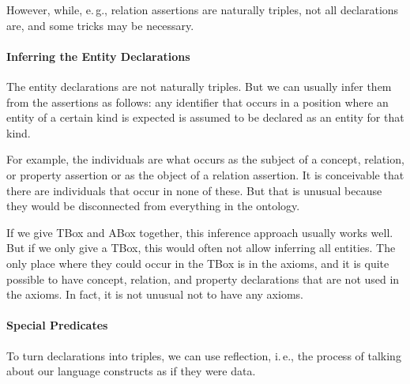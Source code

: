 However, while, e.\,g., relation assertions are naturally triples, not all declarations are, and some tricks may be necessary.

\paragraph{Inferring the Entity Declarations}
The entity declarations are not naturally triples.
But we can usually infer them from the assertions as follows: any identifier that occurs in a position where an entity of a certain kind is expected is assumed to be declared as an entity for that kind.

For example, the individuals are what occurs as the subject of a concept, relation, or property assertion or as the object of a relation assertion.
It is conceivable that there are individuals that occur in none of these.
But that is unusual because they would be disconnected from everything in the ontology.

If we give TBox and ABox together, this inference approach usually works well.
But if we only give a TBox, this would often not allow inferring all entities.
The only place where they could occur in the TBox is in the axioms, and it is quite possible to have concept, relation, and property declarations that are not used in the axioms.
In fact, it is not unusual not to have any axioms.

\paragraph{Special Predicates}
To turn declarations into triples, we can use reflection, i.\,e., the process of talking about our language constructs as if they were data.

